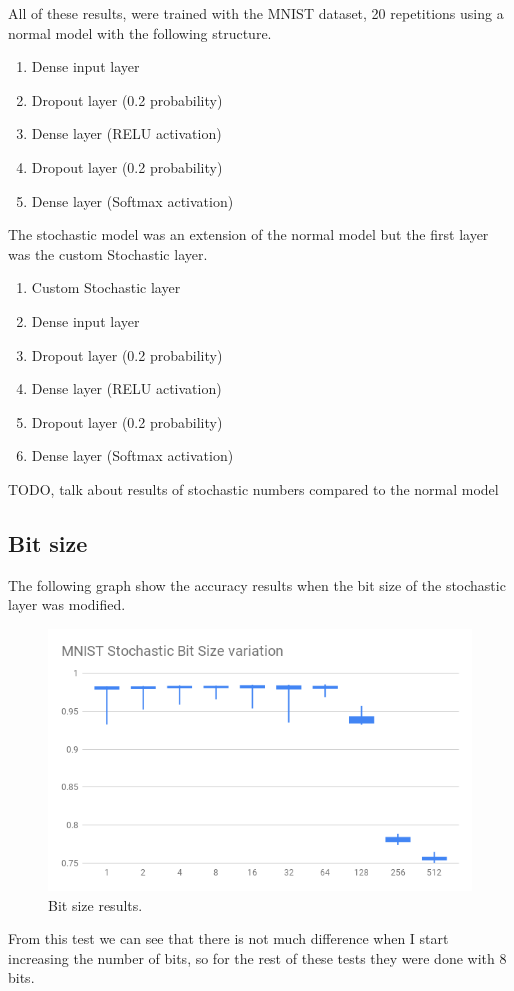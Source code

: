 \documentclass[a4paper,twoside,phd]{BYUPhys}
\begin{document}
All of these results, were trained with the MNIST dataset, 20 repetitions using a normal model with the following structure.
\begin{enumerate}
	\item Dense input layer
	\item Dropout layer (0.2 probability)
    \item Dense layer (RELU activation)
   	\item Dropout layer (0.2 probability)
    \item Dense layer (Softmax activation)
\end{enumerate}
The stochastic model was an extension of the normal model but the first layer was the custom Stochastic layer.
\begin{enumerate}
	\item Custom Stochastic layer
	\item Dense input layer
	\item Dropout layer (0.2 probability)
    \item Dense layer (RELU activation)
   	\item Dropout layer (0.2 probability)
    \item Dense layer (Softmax activation)
\end{enumerate}

TODO, talk about results of stochastic numbers compared to the normal model

\subsection{Bit size}
The following graph show the accuracy results when the bit size of the stochastic layer was modified.
\begin{figure}[H]
\centering
\includegraphics[width=12cm]{results/bitsize.png}
\caption{Bit size results.}
\label{fig:bitsize}
\end{figure}
From this test we can see that there is not much difference when I start increasing the number of bits, so for the rest of these tests they were done with 8 bits.
\end{document}
